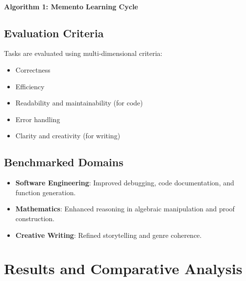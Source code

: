 \documentclass[10pt,a4paper,twocolumn]{article}
\begin{document}
\paragraph{Algorithm 1: Memento Learning Cycle}


\subsection{Evaluation Criteria}


 Tasks are evaluated using multi-dimensional criteria:

\begin{itemize}
    \item Correctness
    \item Efficiency
    \item Readability and maintainability (for code)
    \item Error handling
    \item Clarity and creativity (for writing)



\end{itemize}



\subsection{Benchmarked Domains}



\begin{itemize}
    \item \textbf{Software Engineering}: Improved debugging, code documentation, and function generation.
    \item \textbf{Mathematics}: Enhanced reasoning in algebraic manipulation and proof construction.
    \item \textbf{Creative Writing}: Refined storytelling and genre coherence.
\end{itemize}





\section{{\textbf{Results and Comparative Analysis} } }
\end{document}

